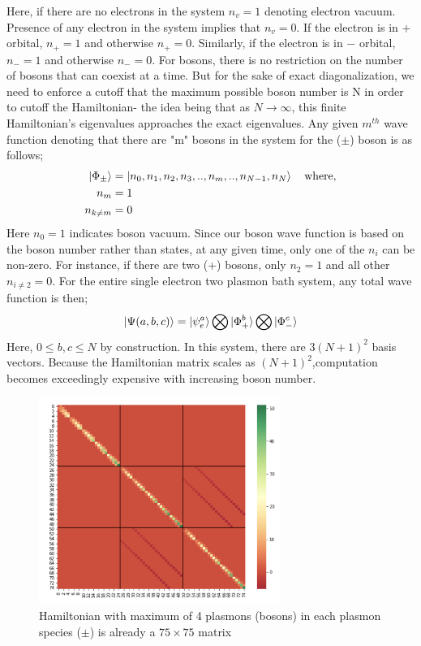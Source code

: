 \documentclass{article}
\begin{document}
Here, if there are no electrons in the system $n_v =1$ denoting electron vacuum. Presence of any electron in the system implies that $n_v =0$. If the electron is in $+$ orbital, $n_+ =1$ and otherwise $n_+=0$. Similarly, if the electron is in $-$ orbital, $n_- =1$ and otherwise $n_-=0$. For bosons, there is no restriction on the number of bosons that can coexist at a time. But for the sake of exact diagonalization, we need to enforce a cutoff that the maximum possible boson number is N in order to cutoff the Hamiltonian- the idea being that as $N\rightarrow\infty$, this finite Hamiltonian's eigenvalues approaches the exact eigenvalues. Any given $m^{th}$ wave function denoting that there are "m" bosons in the system for the ($\pm$) boson is as follows;
\begin{equation}
\begin{aligned}
    \ket{\Phi_\pm} &= \ket{n_0,n_1, n_2, n_3,..,n_m,..,n_{N-1},n_N} \quad\text{where,}\\
    n_m &= 1\\
    n_{k\neq m} &=0
\end{aligned}
\end{equation}
Here $n_0=1$ indicates boson vacuum. Since our boson wave function is based on the boson number rather than states, at any given time, only one of the $n_i$ can be non-zero. For instance, if there are two (+) bosons, only $n_2=1$ and all other $n_{i\neq 2} = 0$. For the entire single electron two plasmon bath system, any total wave function is then;
\begin{equation}
    \ket{\Psi(a,b,c)} = \ket{\psi_e^a} \bigotimes \ket{\Phi_+^b} \bigotimes \ket{\Phi_-^c}
\end{equation}
Here, $0\leq b,c \leq N$ by construction. In this system, there are $3(N+1)^2$ basis vectors. Because the Hamiltonian matrix scales as $(N+1)^2$,computation becomes exceedingly expensive with increasing boson number. 
\begin{figure}
    \centering
    \includegraphics[width = 0.7\textwidth]{Hamiltonian.001.png}
    \caption{Hamiltonian with maximum of 4 plasmons
    (bosons) in each plasmon species ($\pm$) is already a $75\times75$ matrix}
    \label{4 boson H}
\end{figure}
\end{document}

